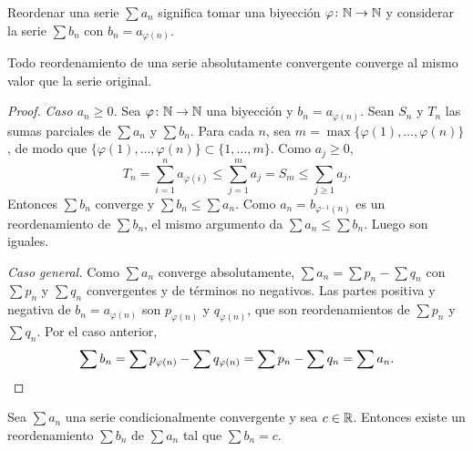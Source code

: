 \begin{definition}
  Reordenar una serie \(\sum a_n\) significa tomar una biyección \(\varphi\colon \mathbb{N} \to \mathbb{N}\) y considerar la serie \(\sum b_n\) con \(b_n = a_{\varphi(n)}\).
\end{definition}

\begin{theorem}
  Todo reordenamiento de una serie absolutamente convergente converge al mismo valor que la serie original.
\end{theorem}

\begin{proof}
  \emph{Caso \(a_n \geq 0\).} Sea \(\varphi\colon \mathbb{N} \to \mathbb{N}\) una biyección y \(b_n = a_{\varphi(n)}\). Sean \(S_n\) y \(T_n\) las sumas parciales de \(\sum a_n\) y \(\sum b_n\). Para cada \(n\), sea \(m = \max\{\varphi(1), \dots, \varphi(n)\}\), de modo que \(\{\varphi(1), \dots, \varphi(n)\} \subset \{1, \dots, m\}\). Como \(a_j \geq 0\),
  \[
    T_n = \sum_{i=1}^{n} a_{\varphi(i)} \leq \sum_{j=1}^{m} a_j = S_m \leq \sum_{j \geq 1} a_j.
  \]
  Entonces \(\sum b_n\) converge y \(\sum b_n \leq \sum a_n\). Como \(a_n = b_{\varphi^{-1}(n)}\) es un reordenamiento de \(\sum b_n\), el mismo argumento da \(\sum a_n \leq \sum b_n\). Luego son iguales.

  \emph{Caso general.} Como \(\sum a_n\) converge absolutamente, \(\sum a_n = \sum p_n - \sum q_n\) con \(\sum p_n\) y \(\sum q_n\) convergentes y de términos no negativos. Las partes positiva y negativa de \(b_n = a_{\varphi(n)}\) son \(p_{\varphi(n)}\) y \(q_{\varphi(n)}\), que son reordenamientos de \(\sum p_n\) y \(\sum q_n\). Por el caso anterior,
  \[
    \sum b_n = \sum p_{\varphi(n)} - \sum q_{\varphi(n)} = \sum p_n - \sum q_n = \sum a_n. \qedhere
  \]
\end{proof}

\begin{theorem}[Riemann]
  Sea \(\sum a_n\) una serie condicionalmente convergente y sea \(c \in \mathbb{R}\). Entonces existe un reordenamiento \(\sum b_n\) de \(\sum a_n\) tal que \(\sum b_n = c\).
\end{theorem}

